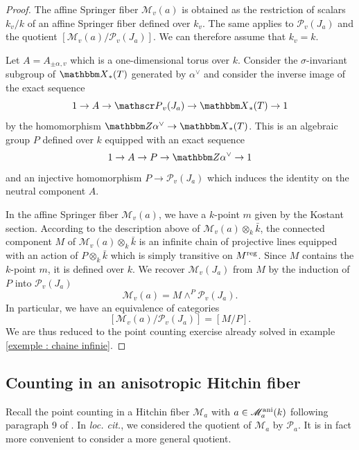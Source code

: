 \documentclass[12pt,english]{smfart}
\numberwithin{equation}{subsection}
\theoremstyle{remark}
\newcommand\calP{{\mathscr P}}
\newcommand\calM{{\mathscr M}}
\newcommand\ZZ{{\mathbbm Z}}
\newcommand\bbX{{\mathbbm X}}
\newcommand\reg{{\rm reg}}
\newcommand\ani{{\rm ani}}
\begin{document}
\begin{proof}
The affine Springer fiber $\calM_v(a)$ is obtained as the restriction of
scalars $k_v/ k$ of an affine Springer fiber defined over $k_v$. The same
applies to $\calP_v(J_a)$ and the quotient $[\calM_v(a)/\calP_v(J_a)]$.
We can therefore assume that $k_v=k$.

Let $A=A_{\pm \alpha,v}$ which is a one-dimensional torus over $k$.
Consider the $\sigma$-invariant subgroup of $\bbX_*(T)$ generated
by $\alpha^\vee$ and consider the inverse image of the exact sequence
$$1\rightarrow A\rightarrow \calP_v(J_a) \rightarrow \bbX_*(T) \rightarrow 1$$
by the homomorphism $\ZZ  \alpha^\vee \rightarrow \bbX_*(T)$. This is an
algebraic group $P$ defined over $k$ equipped with an exact sequence
$$1\rightarrow A \rightarrow P \rightarrow \ZZ  \alpha^\vee \rightarrow 1$$
and an injective homomorphism $P\rightarrow\calP_v(J_a)$ which induces
the identity on the neutral component $A$.

In the affine Springer fiber $\calM_v(a)$, we have a $k$-point $m$
given by the Kostant section. According to the description above of
$\calM_v(a)\otimes_k \bar k$, the connected component $M$ of
$\calM_v(a)\otimes_k \bar k$ is an infinite chain of projective
lines equipped with an action of $P\otimes_k \bar k$ which is simply
transitive on $M^\reg$. Since $M$ contains the $k$-point $m$, it is
defined over $k$. We recover $\calM_v(J_a)$ from $M$ by
the induction of $P$ into $\calP_v(J_a)$
$$\calM_v(a)=M \wedge^P \calP_v(J_a).$$
In particular, we have an equivalence of categories
$$[\calM_v(a)/\calP_v(J_a)]=[M/ P].$$
We are thus reduced to the point counting exercise already solved
in example \ref{exemple : chaine infinie}.
\end{proof}


\subsection{Counting in an anisotropic Hitchin fiber}
\label{subsection : comptage Hitchin}

Recall the point counting in a Hitchin fiber $\calM_a$ with
$a\in\calM_a^\ani(k)$ following paragraph 9 of \cite{N}. In {\em loc.
cit.}, we considered the quotient of $\calM_a$ by $\calP_a$. It is
in fact more convenient to consider a more
general quotient.
\end{document}
